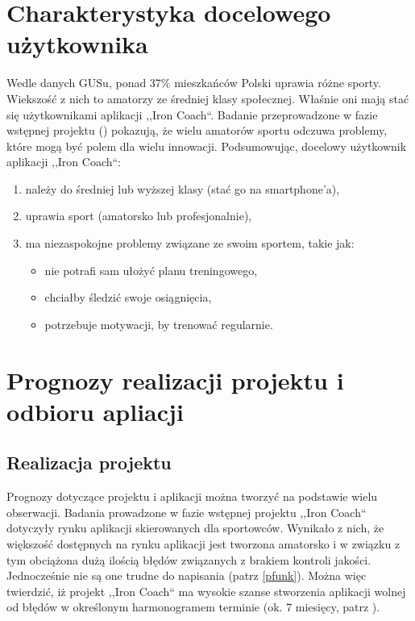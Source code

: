 \section{Charakterystyka docelowego użytkownika}
\noindent Wedle danych GUSu, ponad 37\% mieszkańców Polski uprawia różne sporty. Wiekszość z nich to amatorzy ze średniej klasy społecznej. Właśnie oni mają stać się użytkownikami aplikacji ,,Iron Coach``. Badanie przeprowadzone w fazie wstępnej projektu (\cite{Ba}) pokazują, że wielu amatorów sportu odczuwa problemy, które mogą być polem dla wielu innowacji.
Podsumowując, docelowy użytkownik aplikacji ,,Iron Coach``:
\begin{enumerate}
  \item należy do średniej lub wyższej klasy (stać go na smartphone'a),
  \item uprawia sport (amatorsko lub profesjonalnie),
  \item ma niezaspokojne problemy związane ze swoim sportem, takie jak:
    \begin{itemize}
      \item nie potrafi sam ułożyć planu treningowego,
      \item chciałby śledzić swoje osiągnięcia,
      \item potrzebuje motywacji, by trenować regularnie.
    \end{itemize}
\end{enumerate}
\section{Prognozy realizacji projektu i odbioru apliacji}
\subsection{Realizacja projektu}
\noindent Prognozy dotyczące projektu i aplikacji można tworzyć na podstawie wielu obserwacji. Badania prowadzone w fazie wstępnej projektu ,,Iron Coach`` \cite{Ba} dotyczyły rynku aplikacji skierowanych dla sportowców. Wynikało z nich, że większość dostępnych na rynku aplikacji jest tworzona amatorsko i w związku z tym obciążona dużą ilością błędów związanych z brakiem kontroli jakości. Jednocześnie nie są one trudne do napisania (patrz \ref{pfunk}). Można więc twierdzić, iż projekt ,,Iron Coach`` ma wysokie szanse stworzenia aplikacji wolnej od błędów w określonym harmonogramem terminie (ok. 7 miesięcy, patrz \cite{Ha}). 
